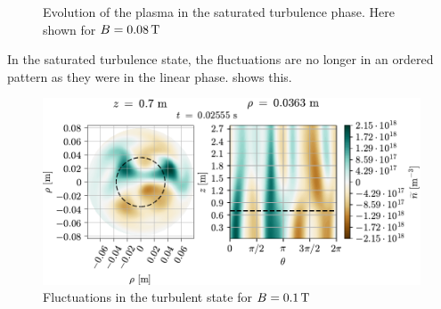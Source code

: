 \begin{figure}[htbp]
\begin{subfigure}[h]{1.00\textwidth}
    \end{subfigure}
    \caption{Evolution of the plasma in the saturated turbulence phase.
        Here shown for $B=0.08\, \text{T}$}
    \label{fig:turbEv}
\end{figure}
%
In the saturated turbulence state, the fluctuations are no longer in an ordered pattern as they were in the linear phase.
 shows this.
%
\begin{figure}[htb]
    \centering
    \includegraphics[width=1.0\textwidth]{fig/results/2DTurbulence/fluct}
    \caption{Fluctuations in the turbulent state for $B=0.1\, \text{T}$}
    \label{fig:2DFluct}
\end{figure}
%
